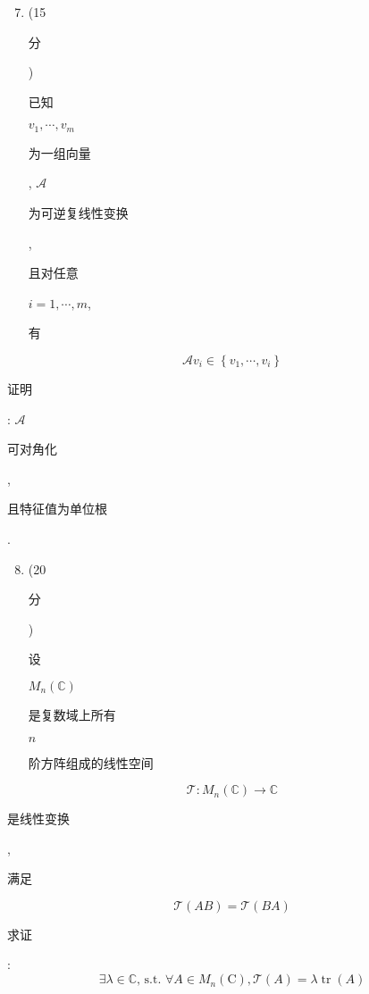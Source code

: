 \documentclass[10pt]{article}
\begin{document}
\begin{enumerate}
  \setcounter{enumi}{6}
  \item (15 \begin{CJK}{UTF8}{mj}分\end{CJK}) \begin{CJK}{UTF8}{mj}已知\end{CJK} $v_{1}, \cdots, v_{m}$ \begin{CJK}{UTF8}{mj}为一组向量\end{CJK}, $\mathscr{A}$ \begin{CJK}{UTF8}{mj}为可逆复线性变换\end{CJK}, \begin{CJK}{UTF8}{mj}且对任意\end{CJK} $i=1, \cdots, m$, \begin{CJK}{UTF8}{mj}有\end{CJK}
\end{enumerate}
$$
\mathscr{A} v_{i} \in\left\{v_{1}, \cdots, v_{i}\right\}
$$
\begin{CJK}{UTF8}{mj}证明\end{CJK}: $\mathscr{A}$ \begin{CJK}{UTF8}{mj}可对角化\end{CJK}, \begin{CJK}{UTF8}{mj}且特征值为单位根\end{CJK}.

\begin{enumerate}
  \setcounter{enumi}{7}
  \item (20 \begin{CJK}{UTF8}{mj}分\end{CJK}) \begin{CJK}{UTF8}{mj}设\end{CJK} $M_{n}(\mathbb{C})$ \begin{CJK}{UTF8}{mj}是复数域上所有\end{CJK} $n$ \begin{CJK}{UTF8}{mj}阶方阵组成的线性空间\end{CJK}
\end{enumerate}
$$
\mathscr{T}: M_{n}(\mathbb{C}) \rightarrow \mathbb{C}
$$
\begin{CJK}{UTF8}{mj}是线性变换\end{CJK}, \begin{CJK}{UTF8}{mj}满足\end{CJK}
$$
\mathscr{T}(A B)=\mathscr{T}(B A)
$$
\begin{CJK}{UTF8}{mj}求证\end{CJK}:
$$
\exists \lambda \in \mathbb{C} \text {, s.t. } \forall A \in M_{n}(\mathrm{C}), \mathscr{T}(A)=\lambda \operatorname{tr}(A)
$$
\end{document}
